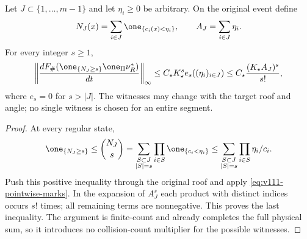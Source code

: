 \begin{corollary}
\label{cor:v111-witness-moments}
Let $J\subset\{1,\ldots,m-1\}$ and let $\eta_i\ge0$ be arbitrary.
On the original event define
\[
 N_J(x)=\sum_{i\in J}\one_{\{c_i(x)<\eta_i\}},\qquad
                         A_J=\sum_{i\in J}\eta_i.
\]
For every integer $s\ge1$,
\begin{equation}\label{eq:v111-factorial}
 \left\|\frac{dF_\#(\one_{\{N_J\ge s\}}\one_\Pi\nu_R^*)}{dt}
                  \right\|_\infty
 \le C_\star K_\star^s e_s((\eta_i)_{i\in J})
 \le C_\star\frac{(K_\star A_J)^s}{s!},
\end{equation}
where $e_s=0$ for $s>|J|$. The witnesses may change with the target
roof and angle; no single witness is chosen for an entire segment.
\end{corollary}
\begin{proof}
At every regular state,
\[
 \one_{\{N_J\ge s\}}\le {N_J\choose s}
   =\sum_{\substack{S\subset J\\|S|=s}}
                       \prod_{i\in S}\one_{\{c_i<\eta_i\}}
   \le\sum_{\substack{S\subset J\\|S|=s}}
                         \prod_{i\in S}\eta_i/c_i.
\]
Push this positive inequality through the original roof and apply
\eqref{eq:v111-pointwise-marks}. In the expansion of $A_J^s$ each
product with distinct indices occurs $s!$ times; all remaining terms
are nonnegative. This proves the last inequality. The argument is
finite-count and already completes the full physical sum, so it
introduces no collision-count multiplier for the possible witnesses.
\end{proof}
